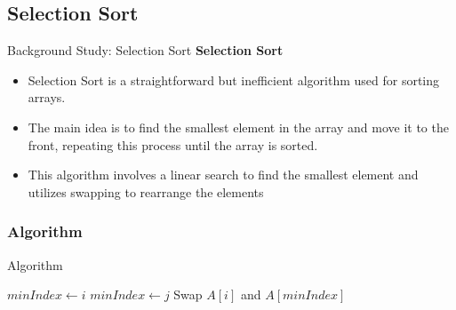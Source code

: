 \documentclass[aspectratio=169]{beamer}
\begin{document}
   \subsection{Selection Sort}
 \begin{frame}{Background Study: Selection Sort}   
    \textbf{\fontsize{14}{16}\selectfont Selection Sort}
    \begin{itemize}
        \item Selection Sort\citep{Knuth-Selection} is a straightforward but inefficient algorithm used for sorting arrays.
        \item The main idea is to find the smallest element in the array and move it to the front, repeating this process until the array is sorted.
         \item This algorithm involves a linear search to find the smallest element and utilizes swapping to rearrange the elements
    \end{itemize}

  \end{frame}
\subsubsection{Algorithm}
  \begin{frame}{Algorithm}
    
  \begin{algorithm}[H]
    \caption{Selection Sort}
    \begin{algorithmic}[1]
       
      \State $minIndex \gets i$
      \State $minIndex \gets j$
      \EndIf
      \EndFor
      \State Swap $A[i]$ and $A[minIndex]$
      \EndFor
      \EndProcedure
    \end{algorithmic}
  \end{algorithm}
\end{frame}
\end{document}
